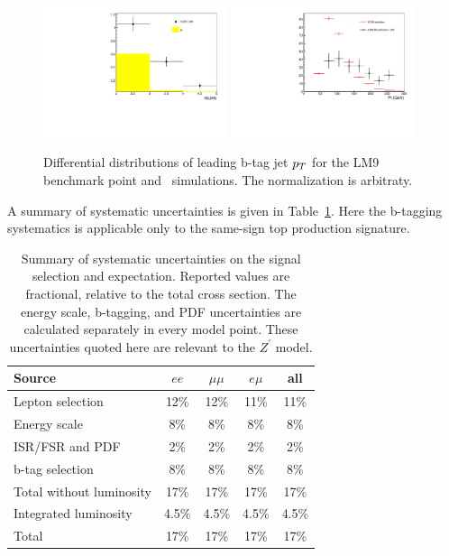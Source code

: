 \begin{figure}[htb]
\begin{center}
\includegraphics[width=0.48\textwidth]{figs/lm9.pdf}
\includegraphics[width=0.48\textwidth]{figs/bjetleading.pdf}
\caption{ Differential distributions of leading b-tag jet $p_T$ for the 
LM9 benchmark point and \ttbar\ simulations.
The normalization is arbitraty.\label{fig:lm9ttbar}}
\end{center}
\end{figure}


A summary of systematic uncertainties is given in Table~\ref{tab:systSumm}.
Here the b-tagging systematics is applicable only to the same-sign top production signature.

\begin{table}[h]
\begin{center}
\caption{\small\label{tab:systSumm}Summary of systematic uncertainties on the signal selection and
expectation. 
Reported values are fractional, relative to the total cross section.
The energy scale, b-tagging, and PDF uncertainties are calculated separately in every model point.
These uncertainties quoted here are relevant to the $Z^\prime$ model.}
\begin{tabular}{lcccc}\hline
Source 					& $ee$		& $\mu\mu$		& $e\mu$	& all 	\\ \hline
Lepton selection			& 12\%		& 12\%			& 11\%		& 11\% 	\\
Energy scale				& 8\%		& 8\%			& 8\%		& 8\% 	\\
ISR/FSR and PDF				& 2\%		& 2\%			& 2\%		& 2\% 	\\
b-tag selection                         & 8\%          	& 8\%                   & 8\%           & 8\% 	\\
Total without luminosity		& 17\%		& 17\%			& 17\%		& 17\%	\\ \hline
Integrated luminosity			& 4.5\%		& 4.5\%			& 4.5\%		& 4.5\%	\\ \hline
Total 					& 17\%	 	& 17\%	 		& 17\% 		& 17\% 	\\
\hline
\end{tabular}
\end{center}
\end{table}

